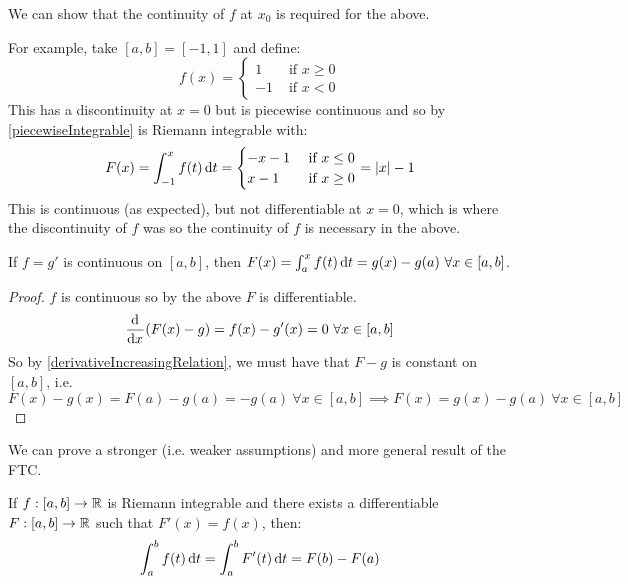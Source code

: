 \documentclass[../main.tex]{subfiles}
\begin{document}
\begin{example}
  We can show that the continuity of $f$ at $x_0$ is required for the above.

  For example, take $[a, b] = [-1, 1]$ and define:
  \[
    f(x) = \begin{cases}
    1 & \text{ if } x \geq 0\\
    -1 & \text{ if } x < 0
    \end{cases}
  \]
  This has a discontinuity at $x = 0$ but is piecewise continuous and so by \cref{piecewiseIntegrable} is Riemann integrable with:
  \[
    F(x) = \int_{-1}^{x} f(t) \d{t} = \begin{cases}
    -x - 1 & \text{ if } x\leq 0 \\
    x - 1 & \text{ if } x \geq 0
    \end{cases} = |x| - 1
  \]
  This is continuous (as expected), but not differentiable at $x = 0$, which is where the discontinuity of $f$ was so the continuity of $f$ is necessary in the above.
\end{example}
\begin{corollary}
  If $f = g'$ is continuous on $[a, b]$, then $F(x) = \int_{a}^{x} f(t) \d{t} = g(x) - g(a)\ \forall x \in [a, b]$. \label{ftcCoro}
\end{corollary}
\begin{proof}
  $f$ is continuous so by the above $F$ is differentiable.
  \[
    \deriv{}{x}(F(x) - g) = f(x) - g'(x) = 0\ \forall x \in [a, b]
  \]
  So by \cref{derivativeIncreasingRelation}, we must have that $F - g$ is constant on $[a, b]$, i.e.
  \[
    F(x) - g(x) = F(a) - g(a) = -g(a)\ \forall x \in [a, b] \implies F(x) = g(x) - g(a)\ \forall x \in [a, b]
  \]
\end{proof}
We can prove a stronger (i.e. weaker assumptions) and more general result of the FTC.
\begin{theorem}
  If $f: [a, b] \to \mathbb{R}$ is Riemann integrable and there exists a differentiable $F: [a, b] \to \mathbb{R}$ such that $F'(x) = f(x)$, then: \label{FTC}
  \[
    \int_{a}^{b} f(t) \d{t} = \int_{a}^{b} F'(t) \d{t} = F(b) - F(a)
  \]
\end{theorem}
\end{document}
